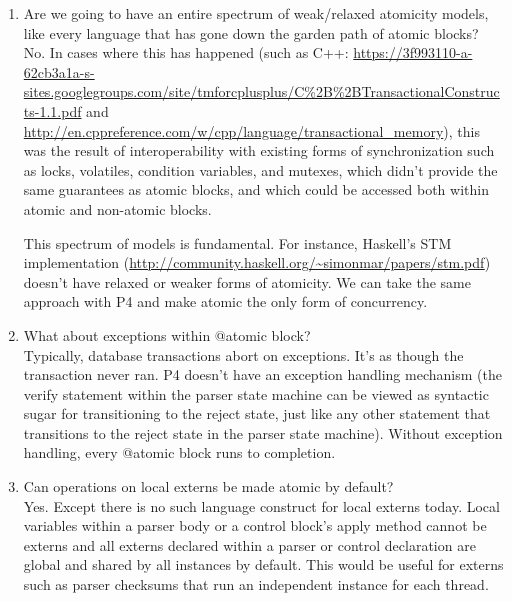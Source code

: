 \begin{enumerate}
\item Are we going to have an entire spectrum of weak/relaxed atomicity models,
like every language that has gone down the garden path of atomic blocks?\\
No. In cases where this has happened (such as C++:
\url{https://3f993110-a-62cb3a1a-s-sites.googlegroups.com/site/tmforcplusplus/C\%2B\%2BTransactionalConstructs-1.1.pdf}
and \url{http://en.cppreference.com/w/cpp/language/transactional\_memory}),
this was the result of interoperability with existing forms of synchronization
such as locks, volatiles, condition variables, and mutexes, which didn't
provide the same guarantees as atomic blocks, and which could be accessed both
within atomic and non-atomic blocks.

This spectrum of models is fundamental. For instance, Haskell's STM
implementation (\url{http://community.haskell.org/~simonmar/papers/stm.pdf})
doesn't have relaxed or weaker forms of atomicity. We can take the same
approach with P4 and make atomic the only form of concurrency.

\item What about exceptions within @atomic block? \\
Typically, database transactions abort on exceptions.  It's as though the
transaction never ran. P4 doesn't have an exception handling mechanism (the
verify statement within the parser state machine can be viewed as syntactic
sugar for transitioning to the reject state, just like any other statement that
transitions to the reject state in the parser state machine). Without exception
handling, every @atomic block runs to completion.

\item Can operations on local externs be made atomic by default? \\
Yes. Except there is no such language construct for local externs today. Local
variables within a parser body or a control block's apply method cannot be
externs and all externs declared within a parser or control declaration are
global and shared by all instances by default. This would be useful for externs
such as parser checksums that run an independent instance for each thread.

\end{enumerate}
